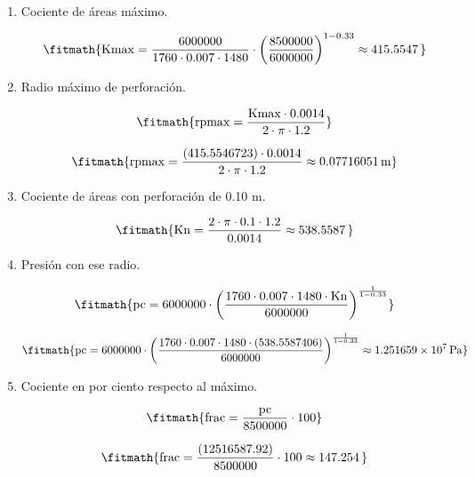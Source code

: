 \begin{enumerate}

\item Cociente de áreas máximo.

\[\fitmath{\mathrm{Kmax}=\frac{6000000}{1760\cdot 0.007\cdot 1480}\cdot {\left(\frac{8500000}{6000000}\right)}^{1-0.33}\approx 415.5547\,}\]

\item Radio máximo de perforación.

\[\fitmath{\mathrm{rpmax}=\frac{\mathrm{Kmax}\cdot 0.0014}{2\cdot \pi\cdot 1.2}}\]

\[\fitmath{\mathrm{rpmax}=\frac{(415.5546723)\cdot 0.0014}{2\cdot \pi\cdot 1.2}\approx 0.07716051\,\mathrm{m}}\]

\item Cociente de áreas con perforación de 0.10 m.

\[\fitmath{\mathrm{Kn}=\frac{2\cdot \pi\cdot 0.1\cdot 1.2}{0.0014}\approx 538.5587\,}\]

\item Presión con ese radio.

\[\fitmath{\mathrm{pc}=6000000\cdot {\left(\frac{1760\cdot 0.007\cdot 1480\cdot \mathrm{Kn}}{6000000}\right)}^{\frac{1}{1-0.33}}}\]

\[\fitmath{\mathrm{pc}=6000000\cdot {\left(\frac{1760\cdot 0.007\cdot 1480\cdot (538.5587406)}{6000000}\right)}^{\frac{1}{1-0.33}}\approx 1.251659\times10^{7}\,\mathrm{Pa}}\]

\item Cociente en por ciento respecto al máximo.

\[\fitmath{\mathrm{frac}=\frac{\mathrm{pc}}{8500000}\cdot 100}\]

\[\fitmath{\mathrm{frac}=\frac{(12516587.92)}{8500000}\cdot 100\approx 147.254\,}\]

\end{enumerate}
